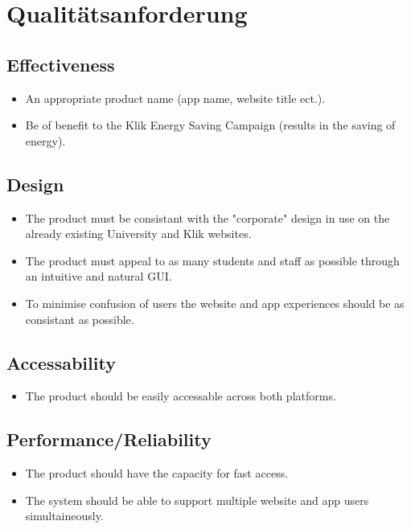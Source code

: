 \section*{Qualit{\"a}tsanforderung}
\subsection{Effectiveness}
\begin{itemize}
\item
An appropriate product name (app name, website title ect.).
\item
Be of benefit to the Klik Energy Saving Campaign (results in the saving of energy).
\end{itemize}
\subsection{Design}
\begin{itemize}
\item
The product must be consistant with the "corporate" design in use on the already existing University and Klik websites.
\item
The product must appeal to as many students and staff as possible through an intuitive and natural GUI.
\item
To minimise confusion of users the website and app experiences should be as consistant as possible.
\end{itemize}
\subsection{Accessability}
\begin{itemize}
\item
The product should be easily accessable across both platforms.
\end{itemize}
\subsection{Performance/Reliability}
\begin{itemize}
\item
The product should have the capacity for fast access.
\item
The system should be able to support multiple website and app users simultaineously.
\end{itemize}
